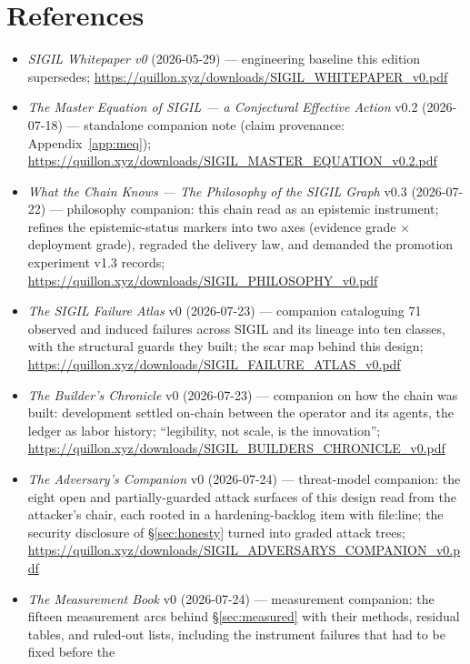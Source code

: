 \documentclass[10pt,a4paper]{article}
\begin{document}
\section*{References}

\small
\begin{itemize}[leftmargin=1.2em,itemsep=1pt]
\item \emph{SIGIL Whitepaper v0} (2026-05-29) — engineering baseline this edition
supersedes; \url{https://quillon.xyz/downloads/SIGIL_WHITEPAPER_v0.pdf}
\item \emph{The Master Equation of SIGIL — a Conjectural Effective Action} v0.2
(2026-07-18) — standalone companion note (claim provenance: Appendix~\ref{app:meq});
\url{https://quillon.xyz/downloads/SIGIL_MASTER_EQUATION_v0.2.pdf}
\item \emph{What the Chain Knows — The Philosophy of the SIGIL Graph} v0.3
(2026-07-22) — philosophy companion: this chain read as an epistemic instrument;
refines the epistemic-status markers into two axes (evidence grade $\times$
deployment grade), regraded the delivery law, and demanded the promotion
experiment v1.3 records;
\url{https://quillon.xyz/downloads/SIGIL_PHILOSOPHY_v0.pdf}
\item \emph{The SIGIL Failure Atlas} v0 (2026-07-23) — companion cataloguing 71
observed and induced failures across SIGIL and its lineage into ten classes, with the
structural guards they built; the scar map behind this design;
\url{https://quillon.xyz/downloads/SIGIL_FAILURE_ATLAS_v0.pdf}
\item \emph{The Builder's Chronicle} v0 (2026-07-23) — companion on how the chain was
built: development settled on-chain between the operator and its agents, the ledger as
labor history; ``legibility, not scale, is the innovation'';
\url{https://quillon.xyz/downloads/SIGIL_BUILDERS_CHRONICLE_v0.pdf}
\item \emph{The Adversary's Companion} v0 (2026-07-24) — threat-model companion: the
eight open and partially-guarded attack surfaces of this design read from the attacker's
chair, each rooted in a hardening-backlog item with file:line; the security disclosure of
\S\ref{sec:honesty} turned into graded attack trees;
\url{https://quillon.xyz/downloads/SIGIL_ADVERSARYS_COMPANION_v0.pdf}
\item \emph{The Measurement Book} v0 (2026-07-24) — measurement companion: the fifteen
measurement arcs behind \S\ref{sec:measured} with their methods, residual tables, and
ruled-out lists, including the instrument failures that had to be fixed before the

\end{itemize}
\end{document}
